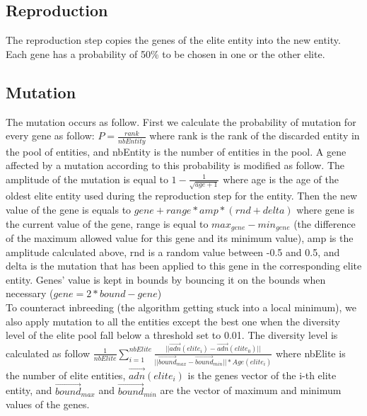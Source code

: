 \subsection{Reproduction}

The reproduction step copies the genes of the elite entity into the new entity. Each gene has a probability of 50\% to be chosen in one or the other elite.\\

\subsection{Mutation}

The mutation occurs as follow. First we calculate the probability of mutation for every gene as follow: $P=\frac{rank}{nbEntity}$ where rank is the rank of the discarded entity in the pool of entities, and nbEntity is the number of entities in the pool. A gene affected by a mutation according to this probability is modified as follow. The amplitude of the mutation is equal to $1-\frac{1}{\sqrt{age+1}}$ where age is the age of the oldest elite entity used during the reproduction step for the entity. Then the new value of the gene is equals to $gene+range*amp*(rnd+delta)$ where gene is the current value of the gene, range is equal to $max_{gene}-min_{gene}$ (the difference of the maximum allowed value for this gene and its minimum value), amp is the amplitude calculated above, rnd is a random value between -0.5 and 0.5, and delta is the mutation that has been applied to this gene in the corresponding elite entity. Genes' value is kept in bounds by bouncing it on the bounds when necessary ($gene=2*bound-gene$)\\

To counteract inbreeding (the algorithm getting stuck into a local minimum), we also apply mutation to all the entities except the best one when the diversity level of the elite pool fall below a threshold set to 0.01. The diversity level is calculated as follow $\frac{1}{nbElite}\sum_{i=1}^{nbElite}\frac{||\overrightarrow{adn}(elite_i)-\overrightarrow{adn}(elite_0)||}{||\overrightarrow{bound}_{max}-\overrightarrow{bound}_{min}||*Age(elite_i)}$ where nbElite is the number of elite entities, $\overrightarrow{adn}(elite_i)$ is the genes vector of the i-th elite entity, and $\overrightarrow{bound}_{max}$ and $\overrightarrow{bound}_{min}$ are the vector of maximum and minimum values of the genes.\\ 

